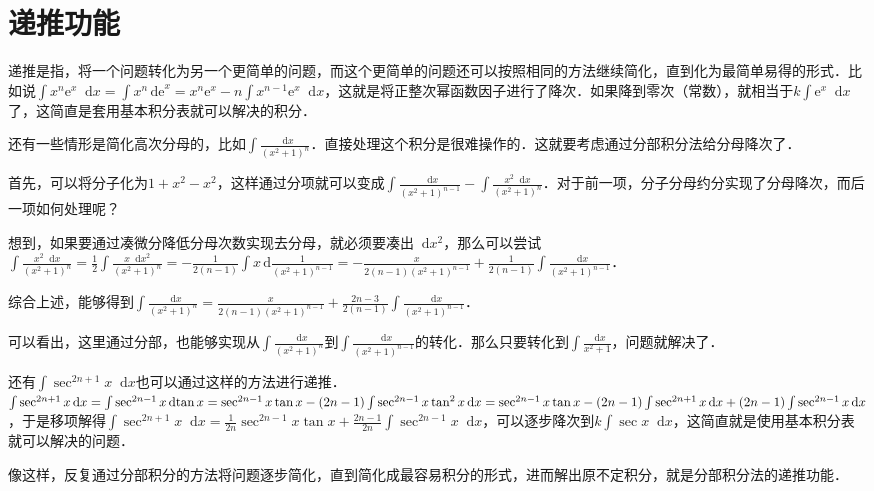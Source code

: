 \documentclass{ctexbook}
\newcommand*{\dif}{\mathop{}\!\mathrm{d}}
\begin{document}
\section{递推功能}
递推是指，将一个问题转化为另一个更简单的问题，而这个更简单的问题还可以按照相同的方法继续简化，直到化为最简单易得的形式．比如说$\int x^{n}\mathrm{e}^{x}\dif{x}=\int x^{n}\,\mathrm{de}^{x}=x^{n}\mathrm{e}^{x}-n\int x^{n-1}\mathrm{e}^{x}\dif{x}$，这就是将正整次幂函数因子进行了降次．如果降到零次（常数），就相当于$k\int\mathrm{e}^{x}\dif{x}$了，这简直是套用基本积分表就可以解决的积分．\par
还有一些情形是简化高次分母的，比如$\int\frac{\dif{x}}{\left(x^{2}+1\right)^{n}}$．直接处理这个积分是很难操作的．这就要考虑通过分部积分法给分母降次了．\par
首先，可以将分子化为$1+x^{2}-x^{2}$，这样通过分项就可以变成$\int\frac{\dif{x}}{\left(x^{2}+1\right)^{n-1}}-\int\frac{x^{2}\dif{x}}{\left(x^{2}+1\right)^{n}}$．对于前一项，分子分母约分实现了分母降次，而后一项如何处理呢？\par
想到，如果要通过凑微分降低分母次数实现去分母，就必须要凑出$\dif{x}^{2}$，那么可以尝试$\int\frac{x^{2}\dif{x}}{\left(x^{2}+1\right)^{n}}=\frac{1}{2}\int\frac{x\dif{x}^{2}}{\left(x^{2}+1\right)^{n}}=-\frac{1}{2\left(n-1\right)}\int x\,\mathrm{d}\frac{1}{\left(x^{2}+1\right)^{n-1}}=-\frac{x}{2\left(n-1\right)\left(x^{2}+1\right)^{n-1}}+\frac{1}{2\left(n-1\right)}\int\frac{\dif{x}}{\left(x^{2}+1\right)^{n-1}}$．\par
综合上述，能够得到$\int\frac{\dif{x}}{\left(x^{2}+1\right)^{n}}=\frac{x}{2\left(n-1\right)\left(x^{2}+1\right)^{n-1}}+\frac{2n-3}{2\left(n-1\right)}\int\frac{\dif{x}}{\left(x^{2}+1\right)^{n-1}}$．\par
可以看出，这里通过分部，也能够实现从$\int\frac{\dif{x}}{\left(x^{2}+1\right)^{n}}$到$\int\frac{\dif{x}}{\left(x^{2}+1\right)^{n-1}}$的转化．那么只要转化到$\int\frac{\dif{x}}{x^{2}+1}$，问题就解决了．\par
还有$\int\sec^{2n+1}{x}\dif{x}$也可以通过这样的方法进行递推．$\int\sec^{2n+1}{x}\dif{x}=\int\sec^{2n-1}{x}\dif{\tan{x}}\\=\sec^{2n-1}{x}\tan{x}-\left(2n-1\right)\int\sec^{2n-1}{x}\tan^{2}{x}\dif{x}=\sec^{2n-1}{x}\tan{x}-\left(2n-1\right)\int\sec^{2n+1}{x}\dif{x}\\+\left(2n-1\right)\int\sec^{2n-1}{x}\dif{x}$，于是移项解得$\int\sec^{2n+1}{x}\dif{x}=\frac{1}{2n}\sec^{2n-1}{x}\tan{x}+\frac{2n-1}{2n}\int\sec^{2n-1}{x}\dif{x}$，可以逐步降次到$k\int\sec{x}\dif{x}$，这简直就是使用基本积分表就可以解决的问题．\par
像这样，反复通过分部积分的方法将问题逐步简化，直到简化成最容易积分的形式，进而解出原不定积分，就是分部积分法的递推功能．\par
\end{document}
